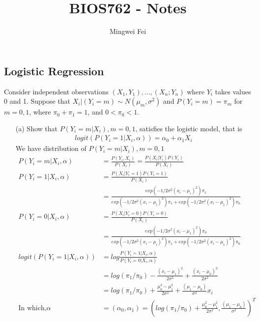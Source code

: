 \documentclass[11pt]{article} %
\title{BIOS762 - Notes}
\author{Mingwei Fei}
\begin{document}
	
	\maketitle


	
\subsection{Logistic Regression}
Consider independent observations $(X_1, Y_1),..., (X_n; Y_n)$ where $Y_i$ takes values 0 and
1. Suppose that $X_i|(Y_i = m) \sim N(\mu_m, \sigma^2)$ and $P(Y_i = m) = \pi_m$ for $m = 0, 1$, where
$\pi_0 + \pi_1 = 1$, and $0 < \pi_0 < 1$.
\begin{itemize}
	\item [(a)] Show that $P(Y_i = m|X_i), m = 0, 1$, satisfies the logistic model, that is
	\begin{align*}
		logit \left(P(Y_i = 1|X_i,\alpha) \right) = \alpha_0 + \alpha_1 X_i
	\end{align*}
	We have distribution of $P(Y_i = m|X_i), m = 0, 1$ 
	\begin{align*}
		P(Y_i=m |X_i,\alpha) & = \frac{P(Y_i, X_i)}{P(X_i)} = \frac{P(X_i|Y_i) P(Y_i)}{P(X_i)}\\
		P(Y_i=1 |X_i,\alpha) &= \frac{P(X_i|Y_i=1) P(Y_i=1)}{P(X_i)} \\
		&= \frac{exp(-1/2\sigma^2 (x_i-\mu_i)^2) \pi_1}{exp(-1/2\sigma^2 (x_i-\mu_i)^2) \pi_1 + exp(-1/2\sigma^2 (x_i-\mu_1)^2)  \pi_0}\\
		P(Y_i=0 |X_i,\alpha) &= \frac{P(X_i|Y_i=0) P(Y_i=0)}{P(X_i)}\\
		&= \frac{exp(-1/2\sigma^2 (x_i-\mu_1)^2)  \pi_0}{exp(-1/2\sigma^2 (x_i-\mu_i)^2) \pi_1 + exp(-1/2\sigma^2 (x_i-\mu_1)^2)  \pi_0}\\
		logit \left(P(Y_i = 1|X_i,\alpha) \right) &= log \frac{ P(Y_i=1 |X_i,\alpha)}{P(Y_i=0 |X_i,\alpha)} \\
		&= log(\pi_1/\pi_0) - \frac{(x_i-\mu_1)^2}{2\sigma^2} + \frac{(x_i-\mu_0)^2}{2\sigma^2}\\
		&= log(\pi_1/\pi_0) +\frac{\mu_0^2 - \mu_1^2}{2\sigma^2} + \frac{(\mu_1-\mu_0)}{\sigma^2}x_i\\
		\text{In which,}  \alpha &= (\alpha_0, \alpha_1) = \left(log(\pi_1/\pi_0) +\frac{\mu_0^2 - \mu_1^2}{2\sigma^2},  \frac{(\mu_1-\mu_0)}{\sigma^2} \right)^T
	\end{align*}     
	

\end{itemize}
\end{document}
